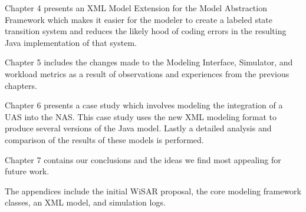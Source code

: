 Chapter 4 presents an XML Model Extension for the Model Abstraction Framework which makes it easier for the modeler to create a labeled state transition system and reduces the likely hood of coding errors in the resulting Java implementation of that system.

Chapter 5 includes the changes made to the Modeling Interface, Simulator, and workload metrics as a result of observations and experiences from the previous chapters.  

Chapter 6 presents a case study which involves modeling the integration of a UAS into the NAS.  This case study uses the new XML modeling format to produce several versions of the Java model.  Lastly a detailed analysis and comparison of the results of these models is performed.

Chapter 7 contains our conclusions and the ideas we find most appealing for future work.

The appendices include the initial WiSAR proposal, the core modeling framework classes, an XML model, and simulation logs.